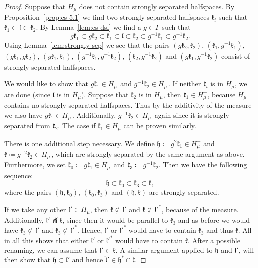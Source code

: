 \begin{proof}
  Suppose that \(H_\mu\) does not contain strongly separated halfspaces. By Proposition~\ref{prop:cs-5.1} we find two strongly separated halfspaces \(\mathfrak{k}_i\) such that \(\mathfrak{k}_1 \subset \mathfrak{l} \subset \mathfrak{k}_2\). By Lemma~\ref{lem:cs-dsl} we find a \(g \in \Gamma\) such that
  \[
    g\mathfrak{k}_1 \subset g\mathfrak{k}_2 \subset \mathfrak{k}_1 \subset \mathfrak{l} \subset \mathfrak{k}_2 \subset g^{-1}\mathfrak{k}_1 \subset g^{-1} \mathfrak{k}_2.
  \]
  Using Lemma~\ref{lem:strongly-sep} we see that the pairs \((g\mathfrak{k}_2, \mathfrak{k}_2)\), \((\mathfrak{k}_1,g^{-1}\mathfrak{k}_1)\), \((g\mathfrak{k}_1, g\mathfrak{k}_2)\), \((g\mathfrak{k}_1, \mathfrak{k}_1)\), \((g^{-1}\mathfrak{k}_1, g^{-1}\mathfrak{k}_2)\), \((\mathfrak{k}_2,g^{-1}\mathfrak{k}_2)\) and \((g\mathfrak{k}_1, g^{-1}\mathfrak{k}_2)\) consist of strongly separated halfspaces.

  We would like to show that \(g\mathfrak{k}_1 \in H_\mu^-\) and \(g^{-1}\mathfrak{k}_2 \in H_\mu^+\). If neither \(\mathfrak{k}_i\) is in \(H_\mu\), we are done (since \(\mathfrak{l}\) is in \(H_\mu\)). Suppose that \(\mathfrak{k}_2\) is in \(H_\mu\), then \(\mathfrak{k}_1 \in H_\mu^-\), because \(H_\mu\) contains no strongly separated halfspaces. Thus by the additivity of the measure we also have \(g\mathfrak{k}_1 \in H_\mu^-\). Additionally, \(g^{-1}\mathfrak{k}_2 \in H_\mu^+\) again since it is strongly separated from \(\mathfrak{k}_2\). The case if \(\mathfrak{k}_1 \in H_\mu\) can be proven similarly.

  There is one additional step necessary. We define \(\mathfrak{h} \coloneqq g^2\mathfrak{k}_1 \in H_\mu^-\) and \(\mathfrak{k} \coloneqq g^{-2}\mathfrak{k}_2 \in H_\mu^+\), which are strongly separated by the same argument as above. Furthermore, we set \(\mathfrak{k_0} \coloneqq g\mathfrak{k}_1 \in H_\mu^-\) and \(\mathfrak{k}_3 \coloneqq g^{-1}\mathfrak{k}_2\). Then we have the following sequence:
  \[
    \mathfrak{h} \subset \mathfrak{k}_0 \subset \mathfrak{k}_3 \subset \mathfrak{k},
  \]
  where the pairs \((\mathfrak{h}, \mathfrak{k}_0)\), \((\mathfrak{k_0}, \mathfrak{k}_3)\) and \((\mathfrak{h}, \mathfrak{k})\) are strongly separated. 

  If we take any other \(\mathfrak{l}' \in H_\mu\), then \(\mathfrak{k} \not\subset \mathfrak{l}'\) and \(\mathfrak{k} \not \subset \mathfrak{l}'^\ast\), because of the measure. Additionally, \(\mathfrak{l}' \not\pitchfork \mathfrak{k}\), since then it would be parallel to \(\mathfrak{k}_3\) and as before we would have \(\mathfrak{k}_3 \not\subset \mathfrak{l}'\) and \(\mathfrak{k}_3 \not\subset \mathfrak{l}'^\ast\). Hence, \(\mathfrak{l}'\) or \(\mathfrak{l}'^\ast\) would have to contain \(\mathfrak{k}_3\) and thus \(\mathfrak{k}\). All in all this shows that either \(\mathfrak{l}'\) or \(\mathfrak{l}'^\ast\) would have to contain \(\mathfrak{k}\). After a possible renaming, we can assume that \(\mathfrak{l}' \subset \mathfrak{k}\). A similar argument applied to \(\mathfrak{h}\) and \(\mathfrak{l}'\), will then show that \(\mathfrak{h} \subset \mathfrak{l}'\) and hence \(\mathfrak{\hat l}' \in \mathfrak{h}^\ast \cap \mathfrak{k}\).
\end{proof}


